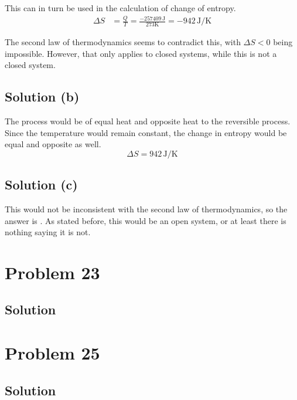\documentclass[12pt]{article}
\begin{document}
            This can in turn be used in the calculation of change of entropy.
            \begin{align}
                \Delta S    &=  \frac{Q}{T}
                    =   \frac{-257409\,\unit{\joule}}{273\unit{\kelvin}}
                    =   \boxed{-942\,\unit{\joule/\kelvin}}
            \end{align}

            The second law of thermodynamics seems to contradict this, with $\Delta S < 0$ being impossible.
            However, that only applies to closed systems, while this is not a closed system.

        \subsection{Solution (b)}
            The process would be of equal heat and opposite heat to the reversible process.
            Since the temperature would remain constant, the change in entropy would be equal and opposite as well.
            \begin{equation}
                \Delta S    =   \boxed{942\,\unit{\joule/\kelvin}}
            \end{equation}

        \subsection{Solution (c)}
            This would not be inconsistent with the second law of thermodynamics, so the answer is .
            As stated before, this would be an open system, or at least there is nothing saying it is not.

    \pagebreak
    \section{Problem 23}

        \subsection{Solution}

    \pagebreak
    \section{Problem 25}

        \subsection{Solution}
\end{document}
